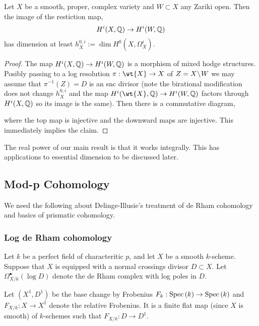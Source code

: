 \documentclass[12pt]{article}
\begin{document}
\begin{theorem}
Let $X$ be a smooth, proper, complex variety and $W \subset X$ any Zariki open. Then the image of the restiction map,
\[ H^i(X, \mathbb{Q}) \to H^i(W, \mathbb{Q}) \]
has dimension at least $h_X^{0,i} := \dim H^0(X, \Omega_X^i)$.
\end{theorem}

\begin{proof}
The map $H^i(X, \mathbb{Q}) \to H^i(W, \mathbb{Q})$ is a morphism of mixed hodge structures. Posibly passing to a log resolution $\pi : \wt{X} \to X$ of $Z = X \! \setminus \! W$ we may assume that $\pi^{-1}(Z) = D$ is an snc divisor (note the birational modification does not change $h^{0,i}_X$ and the map $H^i(\wt{X}, \QQ) \to H^i(W, \QQ)$ factors through $H^i(X, \mathbb{Q})$ so its image is the same). Then there is a commutative diagram,
\begin{center}
\end{center}
where the top map is injective and the downward maps are injective. This immediately implies the claim. 
\end{proof}

The real power of our main result is that it works integrally. This has applications to essential dimension to be discussed later.

\subsection{Mod-p Cohomology}

We need the following about Delinge-Illusie's treatment of de Rham cohomology and basics of prismatic cohomology.


\subsubsection{Log de Rham cohomology}

Let $k$ be a perfect field of characteritic $p$, and let $X$ be a smooth $k$-scheme. Suppose that $X$ is equipped with a normal crossings divisor $D \subset X$. Let $\Omega^\bullet_{X/k}(\log{D})$ denote the de Rham complex with log poles in $D$. 
\par 
Let $(X^1, D^1)$ be the base change by Frobenius $F_k : \mathrm{Spec}\left( k \right) \to \mathrm{Spec}\left( k \right)$ and $F_{X/k} : X \to X^1$ denote the relative Frobenius. It is a finite flat map (since $X$ is smooth) of $k$-schemes such that $F_{X/k} : D \to D^1$.
\end{document}
